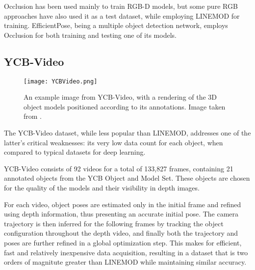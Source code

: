 Occlusion has been used mainly to train RGB-D models, but some pure RGB approaches \cite{PVNet}\cite{PoseCNN} have also used it as a test dataset, while employing LINEMOD for training. EfficientPose, being a multiple object detection network, employs Occlusion for both training and testing one of its models.

\subsection{YCB-Video}

\begin{figure}[ht]
    \centering
    \texttt{[image: YCBVideo.png]}
    \caption{An example image from YCB-Video, with a rendering of the 3D object models positioned according to its annotations. Image taken from \cite{PoseCNN}.}
\end{figure}

The YCB-Video dataset\cite{PoseCNN}, while less popular than LINEMOD, addresses one of the latter's critical weaknesses: its very low data count for each object, when compared to typical datasets for deep learning.

YCB-Video consists of 92 videos for a total of 133,827 frames, containing 21 annotated objects from the YCB Object and Model Set\cite{YCBSet}. These objects are chosen for the quality of the models and their visibility in depth images.

For each video, object poses are estimated only in the initial frame and refined using depth information, thus presenting an accurate initial pose. The camera trajectory is then inferred for the following frames by tracking the object configuration throughout the depth video, and finally both the trajectory and poses are further refined in a global optimization step. This makes for efficient, fast and relatively inexpensive data acquisition, resulting in a dataset that is two orders of magnitute greater than LINEMOD while maintaining similar accuracy.